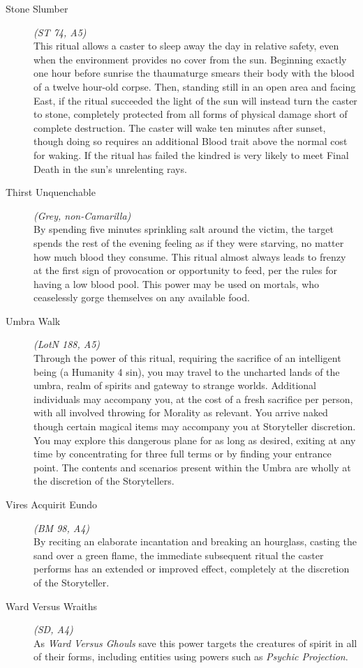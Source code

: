 \begin{description}
	\item[Stone Slumber] \emph{(ST 74, A5)} \hfill \\
	This ritual allows a caster to sleep away the day in relative safety, even when the environment provides no cover from the sun.  
	Beginning exactly one hour before sunrise the thaumaturge smears their body with the blood of a twelve hour-old corpse.  Then, 
	standing still in an open area and facing East, if the ritual succeeded the light of the sun will instead turn the caster to 
	stone, completely protected from all forms of physical damage short of complete destruction.  The caster will wake ten minutes 
	after sunset, though doing so requires an additional Blood trait above the normal cost for waking.  If the ritual has failed 
	the kindred is very likely to meet Final Death in the sun's unrelenting rays. \\

	\item[Thirst Unquenchable] \emph{(Grey, non-Camarilla)} \hfill \\
	By spending five minutes sprinkling salt around the victim, the target spends the rest of the evening feeling as if they were 
	starving, no matter how much blood they consume.  This ritual almost always leads to frenzy at the first sign of provocation 
	or opportunity to feed, per the rules for having a low blood pool.  This power may be used on mortals, who ceaselessly gorge 
	themselves on any available food. \\

	\item[Umbra Walk] \emph{(LotN 188, A5)} \hfill \\
	Through the power of this ritual, requiring the sacrifice of an intelligent being (a Humanity 4 sin), you may travel to the 
	uncharted lands of the umbra, realm of spirits and gateway to strange worlds.  Additional individuals may accompany you, at 
	the cost of a fresh sacrifice per person, with all involved throwing for Morality as relevant.  You arrive naked though certain 
	magical items may accompany you at Storyteller discretion.  You may explore this dangerous plane for as long as desired, exiting 
	at any time by concentrating for three full terms or by finding your entrance point.  The contents and scenarios present within 
	the Umbra are wholly at the discretion of the Storytellers. \\

	\item[Vires Acquirit Eundo] \emph{(BM 98, A4)} \hfill \\
	By reciting an elaborate incantation and breaking an hourglass, casting the sand over a green flame, the immediate subsequent 
	ritual the caster performs has an extended or improved effect, completely at the discretion of the Storyteller. \\

	\item[Ward Versus Wraiths] \emph{(SD, A4)} \hfill \\
	As \emph{Ward Versus Ghouls} save this power targets the creatures of spirit in all of their forms, including entities using 
	powers such as \emph{Psychic Projection}. \\

\end{description}